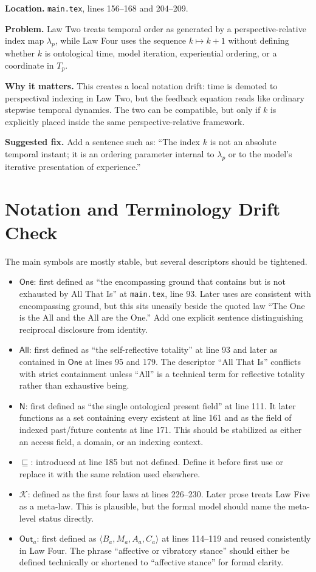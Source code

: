 \documentclass[11pt]{article}
\newcommand{\Now}{\mathsf{N}}
\newcommand{\One}{\mathsf{One}}
\newcommand{\All}{\mathsf{All}}
\newcommand{\Out}{\mathsf{Out}}
\newcommand{\Kernel}{\mathcal{K}}
\begin{document}
\textbf{Location.} \texttt{main.tex}, lines 156--168 and 204--209.

\textbf{Problem.} Law Two treats temporal order as generated by a perspective-relative index map $\lambda_p$, while Law Four uses the sequence $k\mapsto k+1$ without defining whether $k$ is ontological time, model iteration, experiential ordering, or a coordinate in $T_p$.

\textbf{Why it matters.} This creates a local notation drift: time is demoted to perspectival indexing in Law Two, but the feedback equation reads like ordinary stepwise temporal dynamics. The two can be compatible, but only if $k$ is explicitly placed inside the same perspective-relative framework.

\textbf{Suggested fix.} Add a sentence such as: ``The index $k$ is not an absolute temporal instant; it is an ordering parameter internal to $\lambda_p$ or to the model's iterative presentation of experience.''

\section*{Notation and Terminology Drift Check}

The main symbols are mostly stable, but several descriptors should be tightened.

\begin{itemize}
    \item $\One$: first defined as ``the encompassing ground that contains but is not exhausted by All That Is'' at \texttt{main.tex}, line 93. Later uses are consistent with encompassing ground, but this sits uneasily beside the quoted law ``The One is the All and the All are the One.'' Add one explicit sentence distinguishing reciprocal disclosure from identity.
    \item $\All$: first defined as ``the self-reflective totality'' at line 93 and later as contained in $\One$ at lines 95 and 179. The descriptor ``All That Is'' conflicts with strict containment unless ``All'' is a technical term for reflective totality rather than exhaustive being.
    \item $\Now$: first defined as ``the single ontological present field'' at line 111. It later functions as a set containing every existent at line 161 and as the field of indexed past/future contents at line 171. This should be stabilized as either an access field, a domain, or an indexing context.
    \item $\sqsubseteq$: introduced at line 185 but not defined. Define it before first use or replace it with the same relation used elsewhere.
    \item $\Kernel$: defined as the first four laws at lines 226--230. Later prose treats Law Five as a meta-law. This is plausible, but the formal model should name the meta-level status directly.
    \item $\Out_a$: first defined as $\langle B_a,M_a,A_a,C_a\rangle$ at lines 114--119 and reused consistently in Law Four. The phrase ``affective or vibratory stance'' should either be defined technically or shortened to ``affective stance'' for formal clarity.
\end{itemize}
\end{document}
